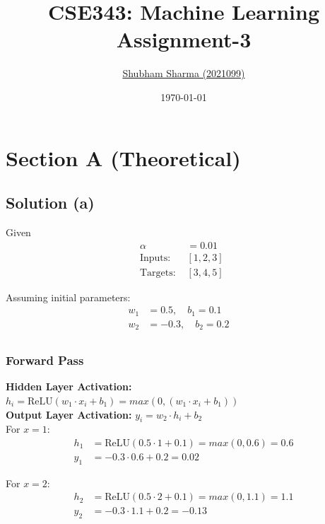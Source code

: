 \documentclass{article}
\title{
    \textbf{CSE343: Machine Learning} \\ \vspace*{-5pt}
    \textbf{\large{Assignment-3}}
}
\author{\href{mailto:shubham21099@iiitd.ac.in}{Shubham Sharma (2021099)}}
\date{\today}
\begin{document}
\maketitle


\section{Section A (Theoretical)}

\subsection*{Solution (a)}
Given
\begin{align*}
\alpha &= 0.01 \quad\\
\text{Inputs: } & [1, 2, 3] \\
\text{Targets: } & [3, 4, 5]
\end{align*}

Assuming initial parameters:
\begin{align*}
w_1 &=  0.5, \quad b_1 = 0.1 \quad \\
w_2 &= -0.3, \quad b_2 = 0.2 \quad \\
\end{align*}

\subsubsection*{Forward Pass}

\textbf{Hidden Layer Activation:} \( h_i = \text{ReLU}(w_1 \cdot x_i + b_1) = max(0, (w_1 \cdot x_i + b_1))\)\\
\textbf{Output Layer Activation:} \( y_i = w_2 \cdot h_i + b_2 \)\\

For \( x = 1 \):
\begin{align*}
    h_1 &= \text{ReLU}(0.5 \cdot 1 + 0.1) = max(0, 0.6) = 0.6 \\
    y_1 &= -0.3 \cdot 0.6 + 0.2 = 0.02
\end{align*}

For \( x = 2 \):
\begin{align*}
    h_2 &= \text{ReLU}(0.5 \cdot 2 + 0.1) = max(0, 1.1) = 1.1 \\
    y_2 &= -0.3 \cdot 1.1 + 0.2 = -0.13
\end{align*}
\end{document}
